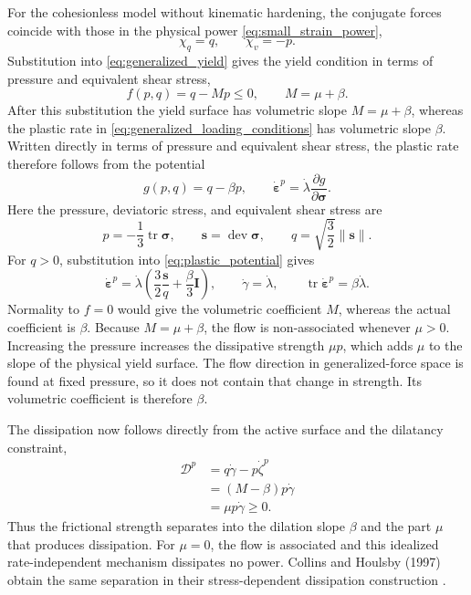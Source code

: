 \documentclass[11pt]{article}
\newcommand{\mbf}[1]{\mathbf{#1}}
\newcommand{\bs}[1]{\boldsymbol{#1}}
\newcommand{\dev}{\operatorname{dev}}
\newcommand{\tr}{\operatorname{tr}}
\begin{document}
For the cohesionless model without kinematic hardening, the conjugate forces
coincide with those in the physical power \eqref{eq:small_strain_power},
\begin{equation}
	\chi_q=q,
	\qquad
	\chi_v=-p.
	\label{eq:true_force_identification}
\end{equation}
Substitution into \eqref{eq:generalized_yield} gives the yield condition in
terms of pressure and equivalent shear stress,
\begin{equation*}
	f(p,q)=q-Mp\le0,
	\qquad
	M=\mu+\beta.
\end{equation*}
After this substitution the yield surface has volumetric slope
\(M=\mu+\beta\), whereas the plastic rate in
\eqref{eq:generalized_loading_conditions} has volumetric slope \(\beta\).
Written directly in terms of pressure and equivalent shear stress, the plastic
rate therefore follows from the potential
\begin{equation}
	g(p,q)=q-\beta p,
	\qquad
	\dot{\bs\varepsilon}^{p}
	=\dot\lambda\frac{\partial g}{\partial\bs\sigma}.
	\label{eq:plastic_potential}
\end{equation}
Here the pressure, deviatoric stress, and equivalent shear stress are
\begin{equation*}
	p=-\frac{1}{3}\tr\bs\sigma,
	\qquad
	\mbf s=\dev\bs\sigma,
	\qquad
	q=\sqrt{\frac{3}{2}}\lVert\mbf s\rVert.
\end{equation*}
For \(q>0\), substitution into \eqref{eq:plastic_potential} gives
\begin{equation*}
	\dot{\bs\varepsilon}^{p}
	=\dot\lambda\left(
	\frac{3}{2}\frac{\mbf s}{q}
	+\frac{\beta}{3}\mbf I
	\right),
	\qquad
	\dot\gamma=\dot\lambda,
	\qquad
	\tr\dot{\bs\varepsilon}^{p}=\beta\dot\lambda.
\end{equation*}
Normality to \(f=0\) would give the volumetric coefficient \(M\), whereas the
actual coefficient is \(\beta\).  Because \(M=\mu+\beta\), the flow is
non-associated whenever \(\mu>0\). Increasing the pressure increases the
dissipative strength \(\mu p\), which adds \(\mu\) to the slope of the
physical yield surface. The flow direction in generalized-force space is found
at fixed pressure, so it does not contain that change in strength. Its
volumetric coefficient is therefore \(\beta\).

The dissipation now follows directly from the active surface and the
dilatancy constraint,
\begin{align*}
	\mathcal D^p
	 & =q\dot\gamma-p\dot\zeta^p
	                              \\
	 & =\left(M-\beta\right)p\dot\gamma
	                              \\
	 & =\mu p\dot\gamma
	\ge0.
\end{align*}
Thus the frictional strength separates into the dilation slope \(\beta\) and
the part \(\mu\) that produces dissipation.  For \(\mu=0\), the flow is
associated and this idealized rate-independent mechanism dissipates no power.
Collins and Houlsby (1997) obtain the same separation in their stress-dependent
dissipation construction \cite[eq.~(5.14)]{collins1997}.
\end{document}
